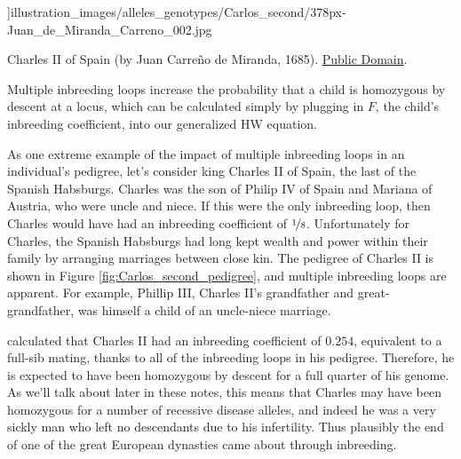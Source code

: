 {{\begin{marginfigure}[-4cm]
\begin{center}
  \textwidth]{illustration_images/alleles_genotypes/Carlos_second/378px-Juan_de_Miranda_Carreno_002.jpg}
\end{center}
\caption{Charles II of Spain (by Juan Carre\~{n}o de Miranda,
  1685). \href{https://it.wikipedia.org/wiki/Carlo_II_di_Spagna\#/media/File:Juan_de_Miranda_Carreno_002.jpg}{Public Domain}.} \label{fig:Carlos_second}
\end{marginfigure}
Multiple inbreeding loops increase the probability that a child
is homozygous by descent at a locus, which can be calculated simply by plugging in $F$, the child's
inbreeding coefficient, into our generalized HW equation.


As one extreme example of the impact of multiple inbreeding loops in
an individual's pedigree, let's consider king Charles II of
Spain, the last of the Spanish Habsburgs.  Charles was the son of
Philip IV of Spain and Mariana of Austria, who were uncle and
niece. If this were the only inbreeding loop, then Charles would have had an
inbreeding coefficient of $\nicefrac{1}{8}$. Unfortunately for Charles, the
Spanish Habsburgs had long kept wealth and power within their family
by arranging marriages between close kin. The pedigree of Charles II is shown in Figure \ref{fig:Carlos_second_pedigree}, and
multiple inbreeding loops are apparent. For example, Phillip III,
Charles II's grandfather and great-grandfather, was himself a child of
an uncle-niece marriage.

\citet{alvarez:09} calculated that Charles II had an inbreeding
coefficient of $0.254$, equivalent to a full-sib mating,
thanks to all of the inbreeding loops in his pedigree. Therefore, he
is expected to have been homozygous by descent for a full quarter of his
genome. As we'll talk about later in these notes, this means that Charles
may have been homozygous for a number of recessive disease alleles,
and indeed he was a very sickly man who left no descendants due to his
infertility.  Thus plausibly the end of one of the great
European dynasties came about through inbreeding. 


}}
